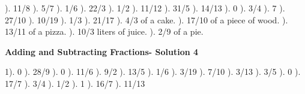 \documentclass{article}%
\begin{document}
). 11/8%
). 5/7%
). 1/6%
). 22/3%
). 1/2%
). 11/12%
). 31/5%
). 14/13%
). 0%
). 3/4%
). 7%
). 27/10%
). 10/19%
). 1/3%
). 21/17%
). 4/3 of a cake.%
). 17/10 of a piece of wood.%
). 13/11 of a pizza.%
). 10/3 liters of juice.%
). 2/9 of a pie.%
\newline%
\newpage%
\large%
\begin{center}%
\textbf{Adding and Subtracting Fractions- Solution 4}%
\newline%
\end{center} \normalsize%
1). 0%
). 28/9%
). 0%
). 11/6%
). 9/2%
). 13/5%
). 1/6%
). 3/19%
). 7/10%
). 3/13%
). 3/5%
). 0%
). 17/7%
). 3/4%
). 1/2%
). 1%
). 16/7%
). 11/13%
\end{document}

